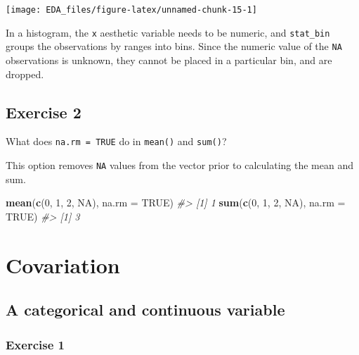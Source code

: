 \documentclass[]{book}
\newenvironment{Shaded}{\begin{snugshade}}{\end{snugshade}}
\newcommand{\CommentTok}[1]{\textcolor[rgb]{0.56,0.35,0.01}{\textit{#1}}}
\newcommand{\DataTypeTok}[1]{\textcolor[rgb]{0.13,0.29,0.53}{#1}}
\newcommand{\DecValTok}[1]{\textcolor[rgb]{0.00,0.00,0.81}{#1}}
\newcommand{\KeywordTok}[1]{\textcolor[rgb]{0.13,0.29,0.53}{\textbf{#1}}}
\newcommand{\NormalTok}[1]{#1}
\newcommand{\OtherTok}[1]{\textcolor[rgb]{0.56,0.35,0.01}{#1}}
\theoremstyle{definition}
\theoremstyle{definition}
\theoremstyle{definition}
\theoremstyle{remark}
\begin{document}
\begin{center}\texttt{[image: EDA\_files/figure-latex/unnamed-chunk-15-1]} \end{center}

In a histogram, the \texttt{x} aesthetic variable needs to be numeric,
and \texttt{stat\_bin} groups the observations by ranges into bins.
Since the numeric value of the \texttt{NA} observations is unknown, they
cannot be placed in a particular bin, and are dropped.

\hypertarget{exercise-2-8}{%
\subsection{Exercise 2}\label{exercise-2-8}}

What does \texttt{na.rm\ =\ TRUE} do in \texttt{mean()} and
\texttt{sum()}?

This option removes \texttt{NA} values from the vector prior to
calculating the mean and sum.

\begin{Shaded}
\begin{Highlighting}[]
\KeywordTok{mean}\NormalTok{(}\KeywordTok{c}\NormalTok{(}\DecValTok{0}\NormalTok{, }\DecValTok{1}\NormalTok{, }\DecValTok{2}\NormalTok{, }\OtherTok{NA}\NormalTok{), }\DataTypeTok{na.rm =} \OtherTok{TRUE}\NormalTok{)}
\CommentTok{#> [1] 1}
\KeywordTok{sum}\NormalTok{(}\KeywordTok{c}\NormalTok{(}\DecValTok{0}\NormalTok{, }\DecValTok{1}\NormalTok{, }\DecValTok{2}\NormalTok{, }\OtherTok{NA}\NormalTok{), }\DataTypeTok{na.rm =} \OtherTok{TRUE}\NormalTok{)}
\CommentTok{#> [1] 3}
\end{Highlighting}
\end{Shaded}

\hypertarget{covariation}{%
\section{Covariation}\label{covariation}}

\hypertarget{a-categorical-and-continuous-variable}{%
\subsection{A categorical and continuous
variable}\label{a-categorical-and-continuous-variable}}

\hypertarget{exercise-1-10}{%
\subsubsection{Exercise 1}\label{exercise-1-10}}
\end{document}
